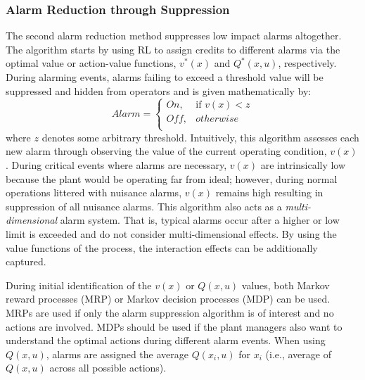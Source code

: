 \subsubsection{Alarm Reduction through Suppression}
The second alarm reduction method suppresses low impact alarms altogether.  The algorithm starts by using RL to assign credits to different alarms via the optimal value or action-value functions, $v^*(x)$ and $Q^*(x, u)$, respectively.  During alarming events, alarms failing to exceed a threshold value will be suppressed and hidden from operators and is given mathematically by:
\[
    Alarm = 
\begin{cases}
    On,              & \text{if } v(x) < z \\
    Off,              & otherwise \\
\end{cases}
\]
where $z$ denotes some arbitrary threshold. Intuitively, this algorithm assesses each new alarm through observing the value of the current operating condition, $v(x)$. During critical events where alarms are necessary, $v(x)$ are intrinsically low because the plant would be operating far from ideal; however, during normal operations littered with nuisance alarms, $v(x)$ remains high resulting in suppression of all nuisance alarms.  This algorithm also acts as a \textit{multi-dimensional} alarm system.  That is, typical alarms occur after a higher or low limit is exceeded and do not consider multi-dimensional effects. By using the value functions of the process, the interaction effects can be additionally captured.

During initial identification of the $v(x)$ or $Q(x, u)$ values, both Markov reward processes (MRP) or Markov decision processes (MDP) can be used.  MRPs are used if only the alarm suppression algorithm is of interest and no actions are involved.  MDPs should be used if the plant managers also want to understand the optimal actions during different alarm events.  When using $Q(x, u)$, alarms are assigned the average $Q(x_i, u)$ for $x_i$ (i.e., average of $Q(x, u)$ across all possible actions).

